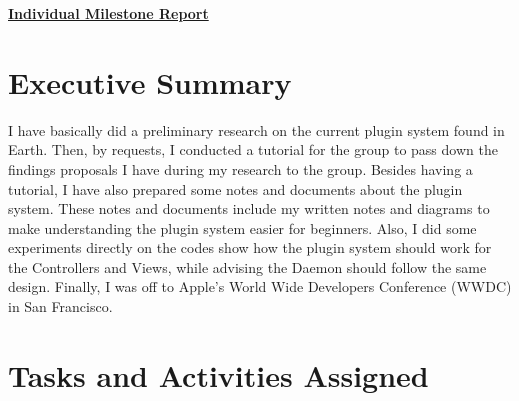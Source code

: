 \documentclass{article}
\begin{document}
\pagestyle{headings}

\begin{center}
{\LARGE\textbf{\underline{{Individual Milestone Report}}}}
\end{center}

\section*{Executive Summary}

I have basically did a preliminary research on the current plugin system found in Earth. Then, by requests, I conducted a tutorial for the group to pass down the findings proposals I have during my research to the group. Besides having a tutorial, I have also prepared some notes and documents about the plugin system. These notes and documents include my written notes and diagrams to make understanding the plugin system easier for beginners. Also, I did some experiments directly on the codes show how the plugin system should work for the Controllers and Views, while advising the Daemon should follow the same design. Finally, I was off to Apple's World Wide Developers Conference (WWDC) in San Francisco. 

\section*{Tasks and Activities Assigned}
\end{document}
